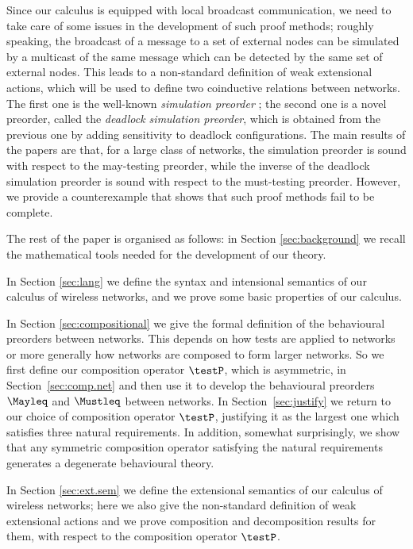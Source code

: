 \documentclass{LMCS}
\begin{document}
Since our calculus is equipped with local broadcast communication, 
we need to take care of some issues in the development of such proof 
methods; roughly speaking, the broadcast of a message to a 
set of external nodes can be simulated by a multicast of the same message 
which can be detected by the same set of external nodes. This leads 
to a non-standard definition of weak extensional actions, which will 
be used to define two coinductive relations between networks. The first one 
is the well-known \emph{simulation preorder} \cite{DGHM09full}; the second 
one is a novel preorder, called the \emph{deadlock simulation preorder}, 
which is obtained from the previous one by adding sensitivity to deadlock 
configurations. 
The main results of the papers are that, for a large class of networks, 
the simulation preorder is sound with respect to the may-testing preorder, 
while the inverse of the deadlock simulation preorder is sound with 
respect to the must-testing preorder. However, we provide a 
counterexample that shows that such proof methods fail 
to be complete.

The rest of the paper is organised as follows: 
in Section \ref{sec:background} we recall the mathematical 
tools needed for the development of our theory. 

In Section \ref{sec:lang} we define the syntax and intensional 
semantics of our calculus of wireless networks, and we prove 
some basic properties of our calculus. 

 In Section \ref{sec:compositional} we give the formal definition
  of the behavioural preorders between networks. This depends on how tests
  are applied to networks or more generally how networks are composed
  to form larger networks.  So we first define our composition
  operator $\testP$, which is asymmetric, in
  Section~\ref{sec:comp.net} and then use it to develop the
  behavioural preorders $\Mayleq$ and $\Mustleq$ between networks. In
  Section~\ref{sec:justify} we return to our choice of composition
  operator $\testP$, justifying it as the largest one which satisfies 
  three natural requirements. In addition, somewhat surprisingly, we show
  that any symmetric composition operator satisfying the natural requirements
  generates a degenerate behavioural theory. 

In Section \ref{sec:ext.sem} we define the extensional semantics of 
our calculus of wireless networks; here we also give the non-standard 
definition of weak extensional actions and we prove composition and 
decomposition results for them, with respect to the composition operator 
$\testP$.
\end{document}
